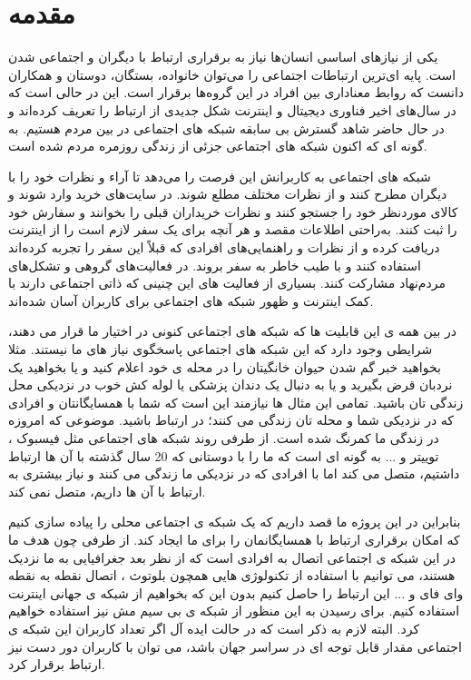 
\chapter{مقدمه}
\thispagestyle{empty}
یکی از نیازهای اساسی انسان‌ها نیاز به برقراری ارتباط با دیگران و اجتماعی شدن است. پایه ای‌ترین ارتباطات اجتماعی را می‌توان خانواده، بستگان، دوستان و همکاران دانست که روابط معناداری بین افراد در این گروه‌ها برقرار است. این در حالی است که در سال‌های اخیر فناوری دیجیتال و اینترنت شکل جدیدی از ارتباط را تعریف کرده‌اند و در حال حاضر شاهد گسترش بی سابقه شبکه های اجتماعی
 در بین مردم هستیم. به گونه ای که اکنون شبکه های اجتماعی جزئی از زندگی روزمره مردم شده است. 
 
 شبکه های اجتماعی به کاربرانش این فرصت را می‌دهد تا آراء و نظرات خود را با دیگران مطرح کنند و از نظرات مختلف مطلع شوند. در سایت‌های خرید وارد شوند و کالای موردنظر خود را جستجو کنند و نظرات خریداران قبلی را بخوانند و سفارش خود را ثبت کنند. به‌راحتی اطلاعات مقصد و هر آنچه برای یک سفر لازم است را از اینترنت دریافت کرده و از نظرات و راهنمایی‌های افرادی که قبلاً این سفر را تجربه کرده‌اند استفاده کنند و با طیب خاطر به سفر بروند. در فعالیت‌های گروهی و تشکل‌های مردم‌نهاد مشارکت کنند. بسیاری از فعالیت های این چنینی که ذاتی اجتماعی دارند با کمک اینترنت و ظهور شبکه های اجتماعی برای کاربران آسان شده‌اند.
 
در بین همه ی این قابلیت ها که شبکه های اجتماعی کنونی در اختیار ما قرار می دهند، شرایطی وجود دارد که این شبکه های اجتماعی پاسخگوی نیاز های ما نیستند. مثلا بخواهید خبر گم شدن حیوان خانگیتان را در محله ی خود اعلام کنید و یا بخواهید یک نردبان قرض بگیرید و یا به دنبال یک دندان پزشکی یا لوله کش خوب در نزدیکی  محل زندگی تان باشید. تمامی این مثال ها نیازمند این است که شما با همسایگانتان و افرادی که در نزدیکی شما و محله تان زندگی می کنند؛ در ارتباط باشید. موضوعی که امروزه در زندگی ما کمرنگ شده است. از طرفی روند شبکه های اجتماعی مثل فیسبوک
، توییتر 
و ... به گونه ای است که ما را با دوستانی که 20 سال گذشته با آن ها ارتباط داشتیم، متصل می کند اما با افرادی که در نزدیکی ما زندگی می کنند و نیاز بیشتری به ارتباط با آن ها داریم، متصل نمی کند.

بنابراین در این پروژه ما قصد داریم که یک شبکه ی اجتماعی محلی را پیاده سازی کنیم که امکان برقراری ارتباط با همسایگانمان را برای ما ایجاد کند. از طرفی چون هدف ما در این شبکه ی اجتماعی اتصال به افرادی است که از نظر بعد جغرافیایی به ما نزدیک هستند، می توانیم با استفاده از تکنولوژی هایی همچون بلوتوث
، اتصال نقطه به نقطه وای فای 
و ... این ارتباط را حاصل کنیم بدون این که بخواهیم از شبکه ی جهانی اینترنت
 استفاده کنیم. برای رسیدن به این منظور از شبکه ی بی سیم مش 
 نیز استفاده خواهیم کرد. البته لازم به ذکر است که در حالت ایده آل اگر تعداد کاربران این شبکه ی اجتماعی مقدار قابل توجه ای در سراسر جهان باشد، می توان با کاربران دور دست نیز ارتباط برقرار کرد. 

